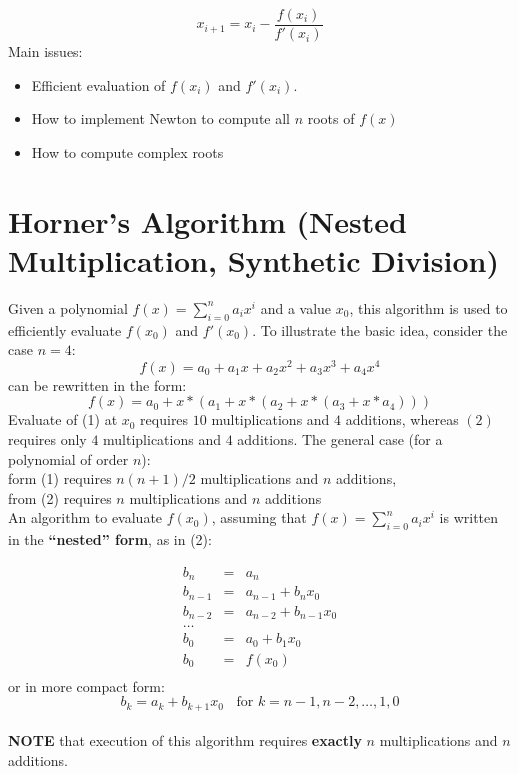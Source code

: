 \documentclass [titlepage,12pt,letter] {article}
\begin{document}
\[
x_{i+1} = x_i - \frac{f(x_i)}{f'(x_i)} 
\]
\noindent 
Main issues: 
\begin{itemize} 
\item Efficient evaluation of $f(x_i)$ and $f'(x_i)$. 
\item How to implement Newton to compute all $n$ roots of $f(x)$ 
\item How to compute complex roots 
\end{itemize} 




\section{Horner's Algorithm (Nested Multiplication, Synthetic Division)} 

Given a polynomial $f(x) = \sum_{i=0}^{n} a_i x^{i}$ and a value $x_0$, this algorithm is used to efficiently evaluate $f(x_0)$ and $f'(x_0)$. To illustrate the basic idea, consider the case $n=4$: 
\begin{equation} 
  f(x) = a_0 + a_1 x + a_2 x^2 + a_3 x^3 + a_4x^4
\end{equation} 
\noindent 
can be rewritten in the form: 
\begin{equation} 
f(x) = a_0 + x * (a_1 + x * ( a_2 + x * (a_3 + x * a_4)))
\end{equation} 
\noindent 
Evaluate of (1) at $x_0$ requires $10$ multiplications and $4$ additions, whereas $(2)$ requires only $4$ multiplications and $4$ additions. 
\noindent 
The general case (for a polynomial of order $n$): \\
form (1) requires $n(n+1)/2$ multiplications and $n$ additions, \\ 
from (2) requires $n$ multiplications and $n$ additions 
\\
An algorithm to evaluate $f(x_0)$, assuming that $f(x) = \sum_{i=0}^{n} a_ix^i$ is written in the {\bf ``nested'' form}, as in (2): 

\begin{eqnarray*} 
b_n &=& a_n \\ 
b_{n-1} &=& a_{n-1} + b_{n} x_0 \\ 
b_{n-2} &=& a_{n-2} + b_{n-1} x_0 \\ 
\dots \\ 
b_{0} &=& a_{0} + b_{1} x_0 \\ 
b_0 &=& f(x_0) \\ 
\end{eqnarray*} 
\noindent 
or in more compact form: 
\[
b_k = a_k + b_{k+1} x_0 \;\; \mbox{ for } k = n-1, n-2, \dots, 1, 0  
\]
\\
{\bf NOTE} that execution of this algorithm requires {\bf exactly} $n$ multiplications and $n$ additions. 
\end{document}
